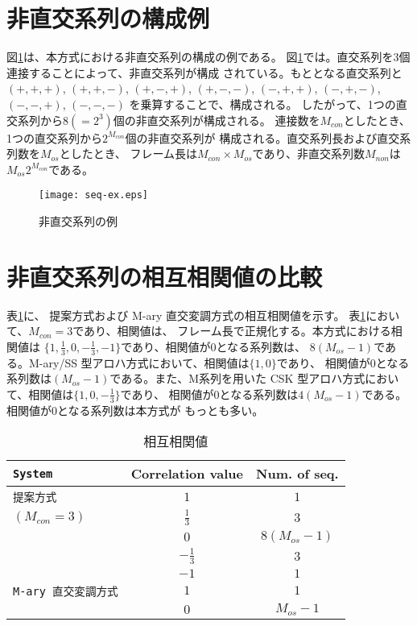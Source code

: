 \section{非直交系列の構成例}
図\ref{fig:example}は、本方式における非直交系列の構成の例である。
図\ref{fig:example}では。直交系列を3個連接することによって、非直交系列が構成
されている。もととなる直交系列と
$(+,+,+)$, $(+,+,-)$, $(+,-,+)$, $(+,-,-)$, $(-,+,+)$,
$(-,+,-)$, $(-,-,+)$, $(-,-,-)$
を乗算することで、構成される。
したがって、1つの直交系列から$8 (=2^3)$個の非直交系列が構成される。
連接数を$M_{con}$としたとき、1つの直交系列から$2^{M_{con}}$個の非直交系列が
構成される。直交系列長および直交系列数を$M_{os}$としたとき、
フレーム長は$M_{con} \times M_{os}$であり、非直交系列数$M_{non}$は
$M_{os} 2^{M_{con}}$である。
\begin{figure}[hpbt]
\begin{center}
  \texttt{[image: seq-ex.eps]}
  \caption{非直交系列の例}
\label{fig:example}
\end{center}
\end{figure}
%

\section{非直交系列の相互相関値の比較}
表\ref{tbl:correlation}に、
提案方式および M-ary 直交変調方式の相互相関値を示す。
表\ref{tbl:correlation}において、$M_{con}=3$であり、相関値は、
フレーム長で正規化する。本方式における相関値は
$\{1, \frac{1}{3}, 0, -\frac{1}{3}, -1 \}$であり、相関値が0となる系列数は、
$8(M_{os} -1)$である。M-ary/SS 型アロハ方式において、相関値は$\{1, 0\}$であり、
相関値が0となる系列数は$(M_{os} -1)$である。また、M系列を用いた
CSK 型アロハ方式において、相関値は$\{1, 0, -\frac{1}{3} \}$であり、
相関値が0となる系列数は$4(M_{os} -1)$である。相関値が0となる系列数は本方式が
もっとも多い。
\begin{center}
\begin{table}[hpbt]
 \caption{相互相関値}
 \label{tbl:correlation}
 \begin{center}
  \begin{tabular}{l|c|c} \hline
   \texttt{System} & Correlation value & Num. of seq.\\ \hline
   \texttt{提案方式} & $1$ & $1$ \\
   \texttt{$(M_{con}=3)$} & $\frac{1}{3}$ & $3$ \\
   \texttt{} & $0$ & $8(M_{os} -1)$ \\
   \texttt{} & $-\frac{1}{3}$ & $3$ \\
   \texttt{} & $-1$ & $1$ \\ \hline
   \texttt{M-ary 直交変調方式} & $1$ & $1$ \\
   \texttt{} & $0$ & $M_{os}-1$ \\ \hline
  \end{tabular}
 \end{center}
\end{table}
\end{center}

